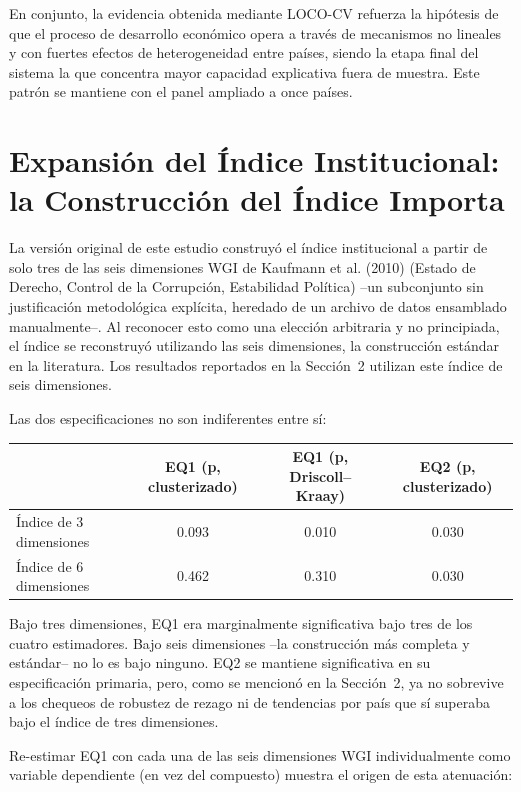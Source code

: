 \documentclass[11pt,a4paper]{article}
\begin{document}
En conjunto, la evidencia obtenida mediante LOCO-CV refuerza la hipótesis de que el proceso de desarrollo económico opera a través de mecanismos no lineales y con fuertes efectos de heterogeneidad entre países, siendo la etapa final del sistema la que concentra mayor capacidad explicativa fuera de muestra. Este patrón se mantiene con el panel ampliado a once países.

\section{Expansión del Índice Institucional: la Construcción del Índice Importa}
\label{sec:indice_institucional}

La versión original de este estudio construyó el índice institucional a partir de solo tres de las seis dimensiones WGI de Kaufmann et al. (2010) (Estado de Derecho, Control de la Corrupción, Estabilidad Política) --un subconjunto sin justificación metodológica explícita, heredado de un archivo de datos ensamblado manualmente--. Al reconocer esto como una elección arbitraria y no principiada, el índice se reconstruyó utilizando las seis dimensiones, la construcción estándar en la literatura. Los resultados reportados en la Sección~2 utilizan este índice de seis dimensiones.

Las dos especificaciones no son indiferentes entre sí:

\begin{center}
\begin{tabular}{lccc}
\toprule
 & EQ1 (p, clusterizado) & EQ1 (p, Driscoll--Kraay) & EQ2 (p, clusterizado) \\
\midrule
Índice de 3 dimensiones & 0.093 & 0.010 & 0.030 \\
Índice de 6 dimensiones & 0.462 & 0.310 & 0.030 \\
\bottomrule
\end{tabular}
\end{center}

Bajo tres dimensiones, EQ1 era marginalmente significativa bajo tres de los cuatro estimadores. Bajo seis dimensiones --la construcción más completa y estándar-- no lo es bajo ninguno. EQ2 se mantiene significativa en su especificación primaria, pero, como se mencionó en la Sección~2, ya no sobrevive a los chequeos de robustez de rezago ni de tendencias por país que sí superaba bajo el índice de tres dimensiones.

Re-estimar EQ1 con cada una de las seis dimensiones WGI individualmente como variable dependiente (en vez del compuesto) muestra el origen de esta atenuación:
\end{document}
